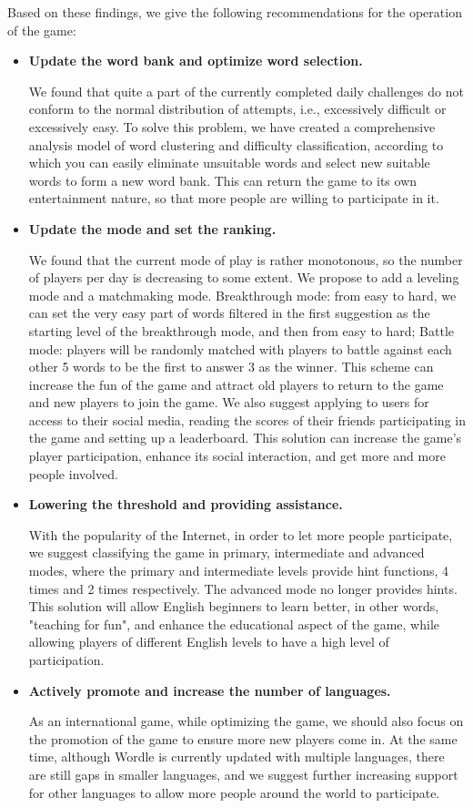 \documentclass{MathModeling}
\begin{document}
	Based on these findings, we give the following recommendations for the operation of the game:

	\begin{itemize}
		\item \textbf{Update the word bank and optimize word selection. }
		
		We found that quite a part of the currently completed daily challenges do not conform to the normal distribution of attempts, i.e., excessively difficult or excessively easy. To solve this problem, we have created a comprehensive analysis model of word clustering and difficulty classification, according to which you can easily eliminate unsuitable words and select new suitable words to form a new word bank. This can return the game to its own entertainment nature, so that more people are willing to participate in it.

		\item \textbf{Update the mode and set the ranking. }
		
		We found that the current mode of play is rather monotonous, so the number of players per day is decreasing to some extent. We propose to add a leveling mode and a matchmaking mode. Breakthrough mode: from easy to hard, we can set the very easy part of words filtered in the first suggestion as the starting level of the breakthrough mode, and then from easy to hard; Battle mode: players will be randomly matched with players to battle against each other 5 words to be the first to answer 3 as the winner. This scheme can increase the fun of the game and attract old players to return to the game and new players to join the game. We also suggest applying to users for access to their social media, reading the scores of their friends participating in the game and setting up a leaderboard. This solution can increase the game's player participation, enhance its social interaction, and get more and more people involved.

		\item \textbf{Lowering the threshold and providing assistance. }
		
		With the popularity of the Internet, in order to let more people participate, we suggest classifying the game in primary, intermediate and advanced modes, where the primary and intermediate levels provide hint functions, 4 times and 2 times respectively. The advanced mode no longer provides hints. This solution will allow English beginners to learn better, in other words, "teaching for fun", and enhance the educational aspect of the game, while allowing players of different English levels to have a high level of participation.

		\item \textbf{Actively promote and increase the number of languages. }
		
		As an international game, while optimizing the game, we should also focus on the promotion of the game to ensure more new players come in. At the same time, although Wordle is currently updated with multiple languages, there are still gaps in smaller languages, and we suggest further increasing support for other languages to allow more people around the world to participate.
	\end{itemize}
\end{document}
